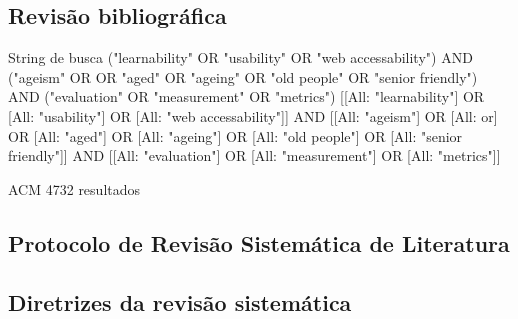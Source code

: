 \begin{apendicesenv}

\partapendices
\chapter[Revisão bibliográfica]{Revisão bibliográfica}

String de busca
("learnability" OR "usability" OR "web accessability") AND ("ageism" OR  OR "aged" OR "ageing" OR "old people" OR "senior friendly") AND ("evaluation" OR "measurement" OR "metrics")
[[All: "learnability"] OR [All: "usability"] OR [All: "web accessability"]] AND [[All: "ageism"] OR [All: or] OR [All: "aged"] OR [All: "ageing"] OR [All: "old people"] OR [All: "senior friendly"]] AND [[All: "evaluation"] OR [All: "measurement"] OR [All: "metrics"]]

ACM 4732 resultados

\section{Protocolo de Revisão Sistemática de Literatura}

\section{Diretrizes da revisão sistemática}


\end{apendicesenv}
